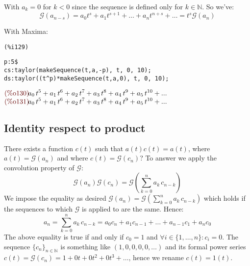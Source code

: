 With $a_k = 0$ for $k < 0$ since the sequence is defined only for $k
\in \mathbb{N} $. So we've:
\begin{displaymath}
  \mathcal{G} (a_{n-s}) =  a_0 t^s +
  a_1 t^{s+1} + \ldots + a_n t^{n+s} + \ldots = t^s \mathcal{G} (a_n)
\end{displaymath}

With Maxima:

\noindent
\begin{minipage}[t]{8ex}{\color{red}\bf
\begin{verbatim}
(%i129) 
\end{verbatim}}
\end{minipage}
\begin{minipage}[t]{\textwidth}{\color{blue}
\begin{verbatim}
p:5$
cs:taylor(makeSequence(t,a,-p), t, 0, 10);
ds:taylor((t^p)*makeSequence(t,a,0), t, 0, 10);
\end{verbatim}}
\end{minipage}
\begin{math}\displaystyle
\parbox{8ex}{\color{labelcolor}(\%o130) }
{a}_{0}\,{t}^{5}+{a}_{1}\,{t}^{6}+{a}_{2}\,{t}^{7}+{a}_{3}\,{t}^{8}+{a}_{4}\,{t}^{9}+{a}_{5}\,{t}^{10}+...
\end{math}\\
\begin{math}\displaystyle
  \parbox{8ex}{\color{labelcolor}(\%o131) }
  {a}_{0}\,{t}^{5}+{a}_{1}\,{t}^{6}+{a}_{2}\,{t}^{7}+{a}_{3}\,{t}^{8}+{a}_{4}\,{t}^{9}+{a}_{5}\,{t}^{10}+...
\end{math}


\subsection{Identity respect to product}

There exists a function $c(t)$ such that $a(t)c(t)=a(t)$, where $a(t)
= \mathcal{G} (a_n)$ and where $c(t) = \mathcal{G} (c_n)$? To answer
we apply the convolution property of $\mathcal{G} $:
\begin{displaymath}
  \mathcal{G} (a_n)\mathcal{G} (c_n) = \mathcal{G}\left(
    \sum_{k=0}^{n}{a}_{k}\,{c}_{n-k}\right)
\end{displaymath}
We impose the equality as desired $\mathcal{G} (a_n) = \mathcal{G}\left(
  \sum_{k=0}^{n}{a}_{k}\,{c}_{n-k}\right)$ which holds if the
sequences to which $\mathcal{G} $ is applied to are the same. Hence:
\begin{displaymath}
  a_n = \sum_{k=0}^{n}{a}_{k}\,{c}_{n-k} = a_0 c_n + a_1 c_{n-1} +
  \ldots + a_{n-1} c_1 + a_n c_0
\end{displaymath}
The above equality is true if and only if $c_0 = 1$ and $\forall
i\in\{1,\ldots,n\}:c_i = 0$. The sequence $\{c_n\}_{n\in \mathbb{N} }$
is something like $(1,0,0,0,0,\ldots)$ and its formal power series
$c(t) = \mathcal{G}(c_n) = 1 + 0t + 0t^2 + 0t^3 + \ldots $, hence we
rename $c(t) = 1(t)$.

